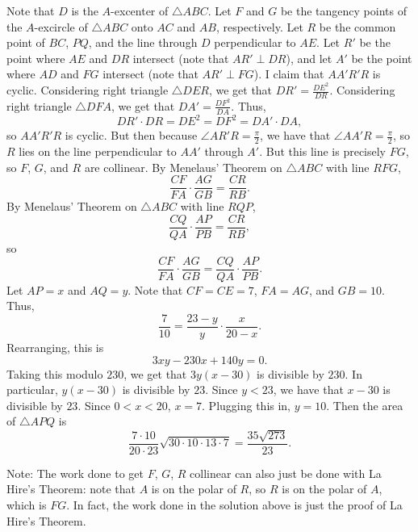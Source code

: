 Note that $D$ is the $A$-excenter of $\triangle{ABC}$. Let $F$ and $G$ be the tangency points of the $A$-excircle of $\triangle{ABC}$ onto $AC$ and $AB$, respectively. Let $R$ be the common point of $BC$, $PQ$, and the line through $D$ perpendicular to $AE$. Let $R'$ be the point where $AE$ and $DR$ intersect (note that $AR'\perp DR$), and let $A'$ be the point where $AD$ and $FG$ intersect (note that $AR'\perp FG$). I claim that $AA'R'R$ is cyclic. Considering right triangle $\triangle{DER}$, we get that $DR'=\frac{DE^2}{DR}$. Considering right triangle $\triangle{DFA}$, we get that $DA'=\frac{DF^2}{DA}$. Thus, \[DR'\cdot DR=DE^2=DF^2=DA'\cdot DA,\] so $AA'R'R$ is cyclic. But then because $\angle{AR'R}=\frac{\pi}{2}$, we have that $\angle{AA'R}=\frac{\pi}{2}$, so $R$ lies on the line perpendicular to $AA'$ through $A'$. But this line is precisely $FG$, so $F$, $G$, and $R$ are collinear. By Menelaus' Theorem on $\triangle{ABC}$ with line $RFG$, \[\frac{CF}{FA}\cdot\frac{AG}{GB}=\frac{CR}{RB}.\] By Menelaus' Theorem on $\triangle{ABC}$ with line $RQP$, \[\frac{CQ}{QA}\cdot\frac{AP}{PB}=\frac{CR}{RB},\] so \[\frac{CF}{FA}\cdot\frac{AG}{GB}=\frac{CQ}{QA}\cdot\frac{AP}{PB}.\] Let $AP=x$ and $AQ=y$. Note that $CF=CE=7$, $FA=AG$, and $GB=10$. Thus, \[\frac{7}{10}=\frac{23-y}{y}\cdot\frac{x}{20-x}.\] Rearranging, this is \[3xy-230x+140y=0.\] Taking this modulo $230$, we get that $3y\left(x-30\right)$ is divisible by $230$. In particular, $y\left(x-30\right)$ is divisible by $23$. Since $y<23$, we have that $x-30$ is divisible by $23$. Since $0<x<20$, $x=7$. Plugging this in, $y=10$. Then the area of $\triangle{APQ}$ is \[\frac{7\cdot10}{20\cdot23}\sqrt{30\cdot10\cdot13\cdot7}=\boxed{\frac{35\sqrt{273}}{23}}.\]

Note: The work done to get $F$, $G$, $R$ collinear can also just be done with La Hire's Theorem: note that $A$ is on the polar of $R$, so $R$ is on the polar of $A$, which is $FG$. In fact, the work done in the solution above is just the proof of La Hire's Theorem.